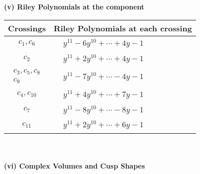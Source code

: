 \documentclass[1p]{elsarticle_modified}
\theoremstyle{definition}
\begin{document}
\newpage\renewcommand{\arraystretch}{1}
\flushleft \textbf{(v) Riley Polynomials at the component}\newline \\
\begin{tabular}{m{50pt}|m{274pt}}
Crossings & \hspace{64pt}Riley Polynomials at each crossing \\
\hline $$\begin{aligned}c_{1},c_{6}\end{aligned}$$&$\begin{aligned}
&y^{11}-6 y^{10}+\cdots+4 y-1
\end{aligned}$\\
\hline $$\begin{aligned}c_{2}\end{aligned}$$&$\begin{aligned}
&y^{11}+2 y^{10}+\cdots+4 y-1
\end{aligned}$\\
\hline $$\begin{aligned}c_{3},c_{5},c_{8}\\c_{9}\end{aligned}$$&$\begin{aligned}
&y^{11}-7 y^{10}+\cdots-4 y-1
\end{aligned}$\\
\hline $$\begin{aligned}c_{4},c_{10}\end{aligned}$$&$\begin{aligned}
&y^{11}+4 y^{10}+\cdots+7 y-1
\end{aligned}$\\
\hline $$\begin{aligned}c_{7}\end{aligned}$$&$\begin{aligned}
&y^{11}-8 y^{10}+\cdots-8 y-1
\end{aligned}$\\
\hline $$\begin{aligned}c_{11}\end{aligned}$$&$\begin{aligned}
&y^{11}+2 y^{10}+\cdots+6 y-1
\end{aligned}$\\
\hline
\end{tabular}\\~\\
\newpage\flushleft \textbf{(vi) Complex Volumes and Cusp Shapes}
\end{document}
